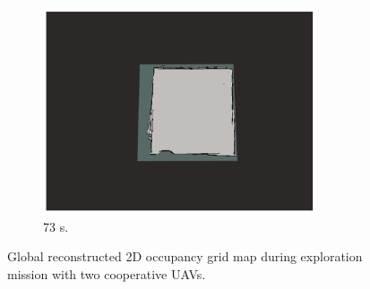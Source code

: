 \documentclass[11pt,openany]{book}
\begin{document}
\begin{algorimth}[H]
\begin{figure}[H]
\begin{subfigure}[H]{0.3\linewidth}
        \includegraphics[width=\linewidth]{assets/4_12_i.png}
        \caption{{73 s.}}
        \label{fig:4.12i}
    \end{subfigure}
    \caption{{Global reconstructed 2D occupancy grid map during exploration mission with two cooperative UAVs.}}
    \label{fig:4.12}
\end{figure}

\end{algorimth}
\end{document}
